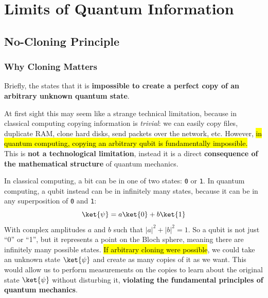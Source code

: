 \section{Limits of Quantum Information}

\subsection{No-Cloning Principle}\label{sec:no-cloning-principle}

\subsubsection{Why Cloning Matters}

Briefly, the  states that it is \textbf{impossible to create a perfect copy of an arbitrary unknown quantum state}.

\highspace
At first sight this may seem like a strange technical limitation, because in classical computing copying information is \emph{trivial}: we can easily copy files, duplicate RAM, clone hard disks, send packets over the network, etc. However, \hl{in quantum computing, copying an arbitrary qubit is fundamentally impossible.} This is \textbf{not a technological limitation}, instead it is a direct \textbf{consequence of the mathematical structure} of quantum mechanics.

\highspace
In classical computing, a bit can be in one of two states: \texttt{0} or \texttt{1}. In quantum computing, a qubit instead can be in infinitely many states, because it can be in any superposition of \texttt{0} and \texttt{1}:
\begin{equation*}
    \ket{\psi} = a\ket{0} + b\ket{1}
\end{equation*}
With complex amplitudes $a$ and $b$ such that $|a|^2 + |b|^2 = 1$. So a qubit is not just ``0'' or ``1'', but it represents a point on the Bloch sphere, meaning there are infinitely many possible states. \hl{If arbitrary cloning were possible}, we could take an unknown state $\ket{\psi}$ and create as many copies of it as we want. This would allow us to perform measurements on the copies to learn about the original state $\ket{\psi}$ without disturbing it, \textbf{violating the fundamental principles of quantum mechanics}.


